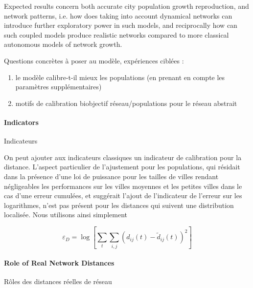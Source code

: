 Expected results concern both accurate city population growth reproduction, and network patterns, i.e. how does taking into account dynamical networks can introduce further exploratory power in such models, and reciprocally how can such coupled models produce realistic networks compared to more classical autonomous models of network growth.

Questions concrètes à poser au modèle, expériences ciblées : 

\begin{enumerate}
\item le modèle calibre-t-il mieux les populations (en prenant en compte les paramètres supplémentaires)
\item motifs de calibration biobjectif réseau/populations pour le réseau abstrait
\end{enumerate}



\paragraph{Indicators}{Indicateurs}

On peut ajouter aux indicateurs classiques un indicateur de calibration pour la distance. L'aspect particulier de l'ajustement pour les populations, qui résidait dans la présence d'une loi de puissance pour les tailles de villes rendant négligeables les performances sur les villes moyennes et les petites villes dans le cas d'une erreur cumulées, et suggérait l'ajout de l'indicateur de l'erreur sur les logarithmes, n'est pas présent pour les distances qui suivent une distribution localisée. Nous utilisons ainsi simplement

\[
\varepsilon_D = \log \left[ \sum_t \sum_{i,j} \left(d_{ij}(t) - \tilde{d}_{ij}(t)\right)^2\right]
\]


\paragraph{Role of Real Network Distances}{Rôles des distances réelles de réseau}





